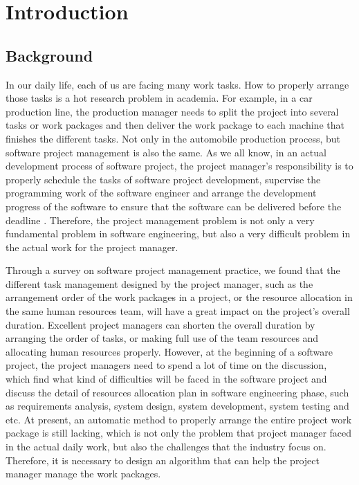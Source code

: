 
\section{Introduction}

\subsection{Background}
%
In our daily life, each of us are facing many work tasks.  How to properly
arrange those tasks is a hot research problem in academia. For example, in a car
production line, the production manager needs to split the project into several
tasks or work packages and then deliver the work package to each machine that
finishes the different tasks. Not only in the automobile production process, but
software project management is also the same. As we all know, in an actual
development process of software project, the project manager's responsibility is
to properly schedule the tasks of software project development, supervise the
programming work of the software engineer and arrange the development progress
of the software to ensure that the software can be delivered before the deadline
\cite{stellman}. Therefore, the project management problem is not only a very
fundamental problem in software engineering, but also a very difficult problem
in the actual work for the project manager.


Through a survey on software project management practice, we found that the
different task management designed by the project manager, such as the
arrangement order of the work packages in a project, or the resource allocation
in the same human resources team, will have a great impact on the project's
overall duration. Excellent project managers can shorten the overall duration by
arranging the order of tasks, or making full use of the team resources and
allocating human resources properly. However, at the beginning of a software
project, the project managers need to spend a lot of time on the discussion,
which find what kind of difficulties will be faced in the software project and
discuss the detail of resources allocation plan in software engineering phase,
such as requirements analysis, system design, system development, system testing
and etc. At present, an automatic method to properly arrange the entire project
work package is still lacking, which is not only the problem that project
manager faced in the actual daily work, but also the challenges that the
industry focus on. Therefore, it is necessary to design an algorithm that can
help the project manager manage the work packages.


